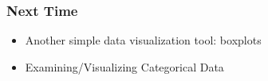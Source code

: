 \documentclass[handout]{beamer}
\newcommand{\blue}[1]{\textcolor{blue2}{#1}}
\begin{document}
\begin{frame}[fragile]
\frametitle{Next Time}

\begin{itemize}
\item Another simple data visualization tool: boxplots
\item Examining/Visualizing \blue{Categorical} Data
\end{itemize}


\end{frame}
\end{document}
